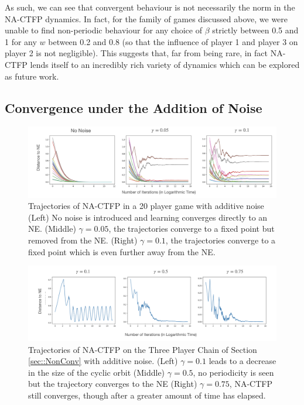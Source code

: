 \documentclass{article}
\theoremstyle{definition}
\begin{document}
  As such, we can see that convergent behaviour is not necessarily the norm in the NA-CTFP dynamics. In fact, for the family of games discussed above, we were unable to find non-periodic behaviour for any choice of $\beta$ strictly between 0.5 and 1 for any $w$ between 0.2 and 0.8 (so that the influence of player 1 and player 3 on player 2 is not negligible). This suggests that, far from being rare, in fact NA-CTFP lends itself to an incredibly rich variety of dynamics which can be explored as future work.
  

  \subsection{Convergence under the Addition of Noise}

  \begin{figure}[t]
    \centering
    \includegraphics[width = 0.9 \columnwidth]{Figures/Noise20Player.png}
    \caption{\label{fig::Noise20Player} Trajectories of NA-CTFP in a 20 player game with additive noise (Left) No noise is introduced and learning converges directly to an NE. (Middle) $\gamma = 0.05$, the trajectories converge to a fixed point but removed from the NE. (Right) $\gamma = 0.1$, the trajectories converge to a fixed point which is even further away from the NE.}
  \end{figure}

  \begin{figure}[t]
    \centering
    \includegraphics[width = 0.9 \columnwidth]{Figures/3PlayerChainNoise.png}
    \caption{\label{fig::3PlayerChainNoise} Trajectories of NA-CTFP on the Three Player Chain of Section \ref{sec::NonConv} with additive noise. (Left) $\gamma = 0.1$ leads to a decrease in the size of the cyclic orbit (Middle) $\gamma = 0.5$, no periodicity is seen but the trajectory converges to the NE (Right) $\gamma = 0.75$, NA-CTFP still converges, though after a greater amount of time has elapsed.}
  \end{figure}
\end{document}
